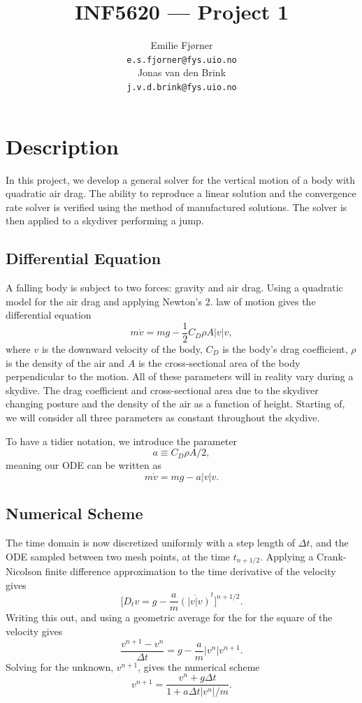 \documentclass[a4paper, 11pt, notitlepage, english]{article}
\author{Emilie Fjørner \\[-0.4cm] \texttt{e.s.fjorner@fys.uio.no} \\[0.2cm] Jonas van den Brink \\[-0.4cm] \texttt{j.v.d.brink@fys.uio.no}}
\title{INF5620 --- Project 1}
\begin{document}
\maketitle


\section*{Description}

In this project, we develop a general solver for the vertical motion of a body with quadratic air drag. The ability to reproduce a linear solution and the convergence rate solver is verified using the method of manufactured solutions. The solver is then applied to a skydiver performing a jump.


\subsection*{Differential Equation}
A falling body is subject to two forces: gravity and air drag. Using a quadratic model for the air drag and applying Newton's 2. law of motion gives the differen\-tial equation
$$m\dot{v} = mg - \frac{1}{2}C_D \rho A |v| v,$$
where $v$ is the downward velocity of the body, $C_D$ is the body's drag coefficient, $\rho$ is the density of the air and $A$ is the cross-sectional area of the body perpendicular to the motion. All of these parameters will in reality vary during a skydive. The drag coefficient and cross-sectional area due to the skydiver changing posture and the density of the air as a function of height. Starting of, we will consider all three parameters as constant throughout the skydive.

To have a tidier notation, we introduce the parameter 
$$a \equiv C_D \rho A /2,$$
meaning our ODE can be written as
$$m\dot{v} = mg - a |v| v.$$


\subsection*{Numerical Scheme}
The time domain is now discretized uniformly with a step length of $\Delta t$, and the ODE sampled between two mesh points, at the time $t_{n+1/2}$. Applying a Crank-Nicolson finite difference approximation to the time derivative of the velocity gives
$$\big[D_t v = g - \frac{a}{m} \overline{(|v|v)}^t\big]^{n+1/2}.$$
Writing this out, and using a geometric average for the for the square of the velocity gives
$$\frac{v^{n+1} - v^n}{\Delta t} = g - \frac{a}{m}|v^n| v^{n+1}.$$
Solving for the unknown, $v^{n+1}$, gives the numerical scheme
$$v^{n+1} = \frac{v^n + g \Delta t}{1 + a \Delta t |v^n|/m}.$$
\end{document}
